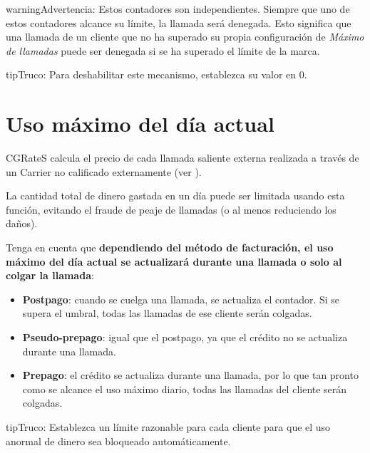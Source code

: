 \documentclass[letterpaper,10pt,spanish]{sphinxmanual}
\begin{document}
\begin{notice}{warning}{Advertencia:}
Estos contadores son independientes. Siempre que uno de estos contadores alcance su límite, la llamada será denegada. Esto significa que una llamada de un cliente que no ha superado su propia configuración de \emph{Máximo de llamadas} puede ser denegada si se ha superado el límite de la marca.
\end{notice}

\begin{notice}{tip}{Truco:}
Para deshabilitar este mecanismo, establezca su valor en 0.
\end{notice}


\section{Uso máximo del día actual}
\label{security_and_maintenance/security/current_day_max_usage:current-day-max-usage}\label{security_and_maintenance/security/current_day_max_usage::doc}\label{security_and_maintenance/security/current_day_max_usage:id1}
CGRateS calcula el precio de cada llamada saliente externa realizada a través de un Carrier no calificado externamente (ver {\hyperref[administration_portal/brand/billing/index:billing]{}}).

La cantidad total de dinero gastada en un día puede ser limitada usando esta función, evitando el fraude de peaje de llamadas (o al menos reduciendo los daños).

Tenga en cuenta que \textbf{dependiendo del método de facturación, el uso máximo del día actual se actualizará durante una llamada o solo al colgar la llamada}:
\begin{itemize}
\item {} 
\textbf{Postpago}: cuando se cuelga una llamada, se actualiza el contador. Si se supera el umbral, todas las llamadas de ese cliente serán colgadas.

\item {} 
\textbf{Pseudo-prepago}: igual que el postpago, ya que el crédito no se actualiza durante una llamada.

\item {} 
\textbf{Prepago}: el crédito se actualiza durante una llamada, por lo que tan pronto como se alcance el uso máximo diario, todas las llamadas del cliente serán colgadas.

\end{itemize}

\begin{notice}{tip}{Truco:}
Establezca un límite razonable para cada cliente para que el uso anormal de dinero sea bloqueado automáticamente.
\end{notice}
\end{document}
